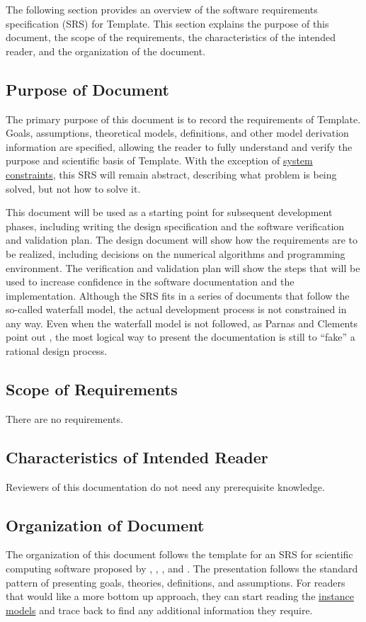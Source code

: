 \documentclass[12pt]{article}
\begin{document}
The following section provides an overview of the software requirements specification (SRS) for Template. This section explains the purpose of this document, the scope of the requirements, the characteristics of the intended reader, and the organization of the document.

\subsection{Purpose of Document}
\label{Sec:DocPurpose}
The primary purpose of this document is to record the requirements of Template. Goals, assumptions, theoretical models, definitions, and other model derivation information are specified, allowing the reader to fully understand and verify the purpose and scientific basis of Template. With the exception of \hyperref[Sec:SysConstraints]{system constraints}, this SRS will remain abstract, describing what problem is being solved, but not how to solve it.

This document will be used as a starting point for subsequent development phases, including writing the design specification and the software verification and validation plan. The design document will show how the requirements are to be realized, including decisions on the numerical algorithms and programming environment. The verification and validation plan will show the steps that will be used to increase confidence in the software documentation and the implementation. Although the SRS fits in a series of documents that follow the so-called waterfall model, the actual development process is not constrained in any way. Even when the waterfall model is not followed, as Parnas and Clements point out \cite{parnasClements1986}, the most logical way to present the documentation is still to ``fake'' a rational design process.

\subsection{Scope of Requirements}
\label{Sec:ReqsScope}
There are no requirements.

\subsection{Characteristics of Intended Reader}
\label{Sec:ReaderChars}
Reviewers of this documentation do not need any prerequisite knowledge.

\subsection{Organization of Document}
\label{Sec:DocOrg}
The organization of this document follows the template for an SRS for scientific computing software proposed by \cite{koothoor2013}, \cite{smithLai2005}, \cite{smithEtAl2007}, and \cite{smithKoothoor2016}. The presentation follows the standard pattern of presenting goals, theories, definitions, and assumptions. For readers that would like a more bottom up approach, they can start reading the \hyperref[Sec:IMs]{instance models} and trace back to find any additional information they require.
\end{document}
